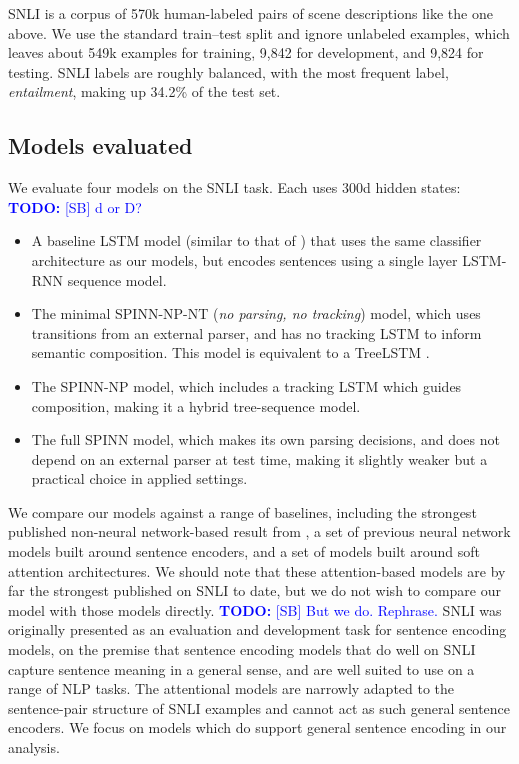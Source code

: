 \documentclass[11pt]{article}
\newcommand\todo[1]{\textcolor{blue}{\textbf{TODO:} #1}}
\begin{document}
SNLI is a corpus of 570k human-labeled pairs of scene descriptions like the one above. We use the standard train--test split and ignore unlabeled examples, which leaves about 549k examples for training, 9,842 for development, and 9,824 for testing. SNLI labels are roughly balanced, with the most frequent label, {\it entailment}, making up 34.2\% of the test set.


\subsection{Models evaluated}

We evaluate four models on the SNLI task. Each uses 300d hidden states: \todo{[SB] d or D?}
\begin{itemize}
\item A baseline LSTM model (similar to that of \citet{snli:emnlp2015}) that uses the same classifier architecture as our models, but encodes sentences using a single layer LSTM-RNN sequence model.
\item The minimal SPINN-NP-NT (\textit{no parsing, no tracking}) model, which uses transitions from an external parser, and has no tracking LSTM to inform semantic composition. This model is equivalent to a TreeLSTM \citep{tai2015improved}.
\item The SPINN-NP model, which includes a tracking LSTM which guides composition, making it a hybrid tree-sequence model.
\item The full SPINN model, which makes its own parsing decisions, and does not depend on an external parser at test time, making it slightly weaker but a practical choice in applied settings.
\end{itemize}

We compare our models against a range of baselines, including the strongest published non-neural network-based result from \citep{snli:emnlp2015}, a set of previous neural network models built around sentence encoders, and a set of models built around soft attention architectures. We should note that these attention-based models are by far the strongest published on SNLI to date, but we do not wish to compare our model with those models directly. \todo{[SB] But we do. Rephrase.} SNLI was originally presented as an evaluation and development task for sentence encoding models, on the premise that sentence encoding models that do well on SNLI capture sentence meaning in a general sense, and are well suited to use on a range of NLP tasks. The attentional models are narrowly adapted to the sentence-pair structure of SNLI examples and cannot act as such general sentence encoders. We focus on models which do support general sentence encoding in our analysis.
\end{document}
